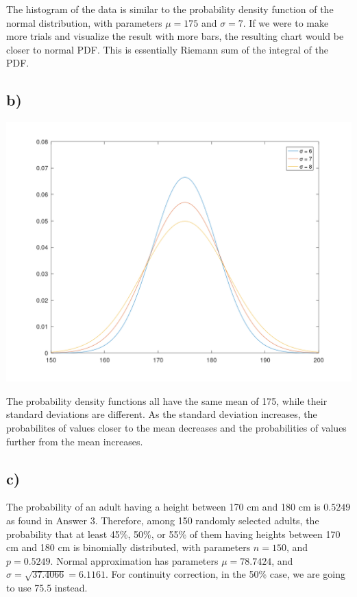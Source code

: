 \documentclass[12pt]{article}
\begin{document}
The histogram of the data is similar to the probability density function of the
normal distribution, with parameters $\mu = 175$ and $\sigma = 7$. If we were to
make more trials and visualize the result with more bars, the resulting chart
would be closer to normal PDF. This is essentially Riemann sum of the integral
of the PDF.

\subsection*{b)}

\includegraphics[width=\textwidth]{the2_plot.png}

The probability density functions all have the same mean of 175, while their
standard deviations are different. As the standard deviation increases, the
probabilites of values closer to the mean decreases and the probabilities of
values further from the mean increases.

\newpage

\subsection*{c)}

The probability of an adult having a height between 170 cm and 180 cm is
$0.5249$ as found in Answer 3. Therefore, among 150 randomly selected adults,
the probability that at least 45\%, 50\%, or 55\% of them having heights between
170 cm and 180 cm is binomially distributed, with parameters $n = 150$, and $p =
0.5249$. Normal approximation has parameters $\mu = 78.7424$, and $\sigma =
\sqrt{37.4066} = 6.1161$. For continuity correction, in the 50\% case, we are
going to use 75.5 instead.
\end{document}
